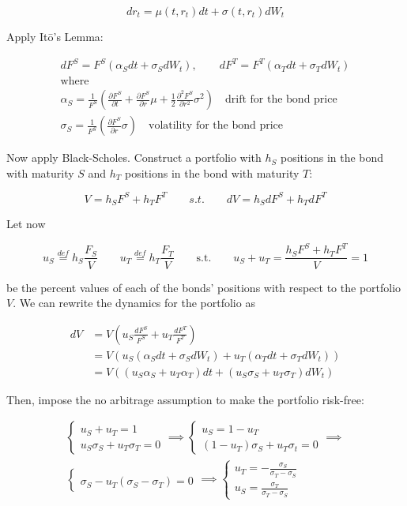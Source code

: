 \documentclass[oneside,titlepage,headinclude,12pt,a4paper,BCOR5mm,footinclude]{book}
\theoremstyle{defn}
\newcommand\de\partial
\begin{document}
\[
  dr_t = \mu(t,r_t)dt + \sigma(t,r_t)dW_t
\]

Apply It\=o's Lemma:

\begin{gather*}
  dF^S = F^S(\alpha_S dt + \sigma_S dW_t), \quad\quad
  dF^T = F^T(\alpha_T dt + \sigma_T dW_t) \\ 
  \text{where} \\
  \alpha_S = \frac{1}{F^S}\left(\frac{\de F^S}{\de t} + \frac{\de F^S}{\de r}\mu + \frac{1}{2}\frac{\de^2F^S}{\de r^2}\sigma^2\right) 
  \quad \text{drift for the bond price} \\
  \sigma_S = \frac{1}{F^S}\left(\frac{\de F^S}{\de r}\sigma \right) \quad\text{volatility for the bond price}
\end{gather*}

Now apply Black-Scholes. Construct a portfolio  with $h_S$ positions in the bond
with maturity $S$ and $h_T$ positions in the bond with maturity $T$:

\[
  V = h_S F^S + h_T F^T \quad\quad s.t. \quad\quad
  dV = h_S dF^S + h_T dF^T
\]

Let now

\[
  u_S \stackrel{def}{=} h_S \frac{F_S}{V} \quad\quad
  u_T \stackrel{def}{=} h_T \frac{F_T}{V} \quad\quad
  \text{s.t.}\quad\quad
  u_S+u_T = \frac{h_SF^S + h_TF^T}{V} = 1
\]

be  the percent  values of  each of  the bonds'  positions with  respect to  the
portfolio $V$. We can rewrite the dynamics for the portfolio as

\begin{align*}
  dV &= V\left( u_S \frac{dF^S}{F^S} + u_T \frac{dF^T}{F^T} \right)
  \\&= V(u_S(\alpha_Sdt + \sigma_S dW_t) + u_T(\alpha_Tdt + \sigma_T dW_t))
  \\&= V((u_S\alpha_S + u_T\alpha_T)dt + (u_S\sigma_S + u_T\sigma_T)dW_t)
\end{align*}

Then, impose the no arbitrage assumption to make the portfolio risk-free:

\begin{gather*}
  \begin{cases}
    u_S + u_T = 1 \\ u_S\sigma_S + u_T\sigma_T = 0
  \end{cases}
  \implies
  \begin{cases}
    u_S = 1 - u_T \\
    (1-u_T)\sigma_S + u_T\sigma_t = 0
  \end{cases}
  \implies \\
  \begin{cases}
    \\ \sigma_S - u_T(\sigma_S-\sigma_T) = 0
  \end{cases}
  \implies 
  \begin{cases}
    u_T = -\frac{\sigma_S}{\sigma_T - \sigma_S}\\
    u_S = \frac{\sigma_T}{\sigma_T - \sigma_S}
  \end{cases}
\end{gather*}
\end{document}
